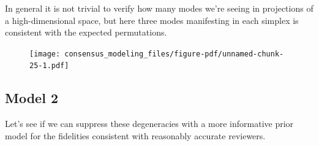 \documentclass[
  letterpaper,
  DIV=11,
  numbers=noendperiod]{scrartcl}
\newenvironment{Shaded}{\begin{snugshade}}{\end{snugshade}}
\newcommand{\AttributeTok}[1]{\textcolor[rgb]{0.40,0.45,0.13}{#1}}
\newcommand{\ControlFlowTok}[1]{\textcolor[rgb]{0.00,0.23,0.31}{#1}}
\newcommand{\DecValTok}[1]{\textcolor[rgb]{0.68,0.00,0.00}{#1}}
\newcommand{\FunctionTok}[1]{\textcolor[rgb]{0.28,0.35,0.67}{#1}}
\newcommand{\NormalTok}[1]{\textcolor[rgb]{0.00,0.23,0.31}{#1}}
\newcommand{\OtherTok}[1]{\textcolor[rgb]{0.00,0.23,0.31}{#1}}
\newcommand{\SpecialCharTok}[1]{\textcolor[rgb]{0.37,0.37,0.37}{#1}}
\newcommand{\StringTok}[1]{\textcolor[rgb]{0.13,0.47,0.30}{#1}}
\begin{document}
In general it is not trivial to verify how many modes we're seeing in
projections of a high-dimensional space, but here three modes
manifesting in each simplex is consistent with the expected
permutations.

\begin{Shaded}
\end{Shaded}

\begin{figure}[H]

{\centering \texttt{[image: consensus\_modeling\_files/figure-pdf/unnamed-chunk-25-1.pdf]}

}

\end{figure}

\hypertarget{model-2}{%
\subsection{Model 2}\label{model-2}}

Let's see if we can suppress these degeneracies with a more informative
prior model for the fidelities consistent with reasonably accurate
reviewers.
\end{document}
